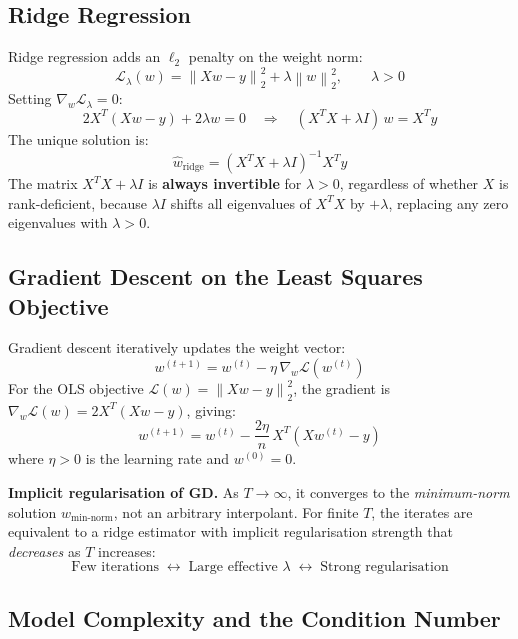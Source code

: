 \documentclass[12pt, a4paper]{article}
\newcommand{\norm}[1]{\left\lVert #1 \right\rVert}
\begin{document}
\subsection{Ridge Regression}

Ridge regression adds an $\ell_2$ penalty on the weight norm:
\begin{equation}
  \mathcal{L}_\lambda(w) = \norm{Xw - y}_2^2 + \lambda\norm{w}_2^2, \qquad \lambda > 0
  \label{eq:ridge_loss}
\end{equation}
Setting $\nabla_w \mathcal{L}_\lambda = 0$:
\[
  2X^T(Xw - y) + 2\lambda w = 0 \quad\Longrightarrow\quad (X^TX + \lambda I)\,w = X^Ty
\]
The unique solution is:
\begin{equation}
  \hat{w}_{\mathrm{ridge}} = (X^TX + \lambda I)^{-1}X^Ty
  \label{eq:ridge}
\end{equation}
The matrix $X^TX + \lambda I$ is \textbf{always invertible} for $\lambda > 0$, regardless of whether $X$ is rank-deficient, because $\lambda I$ shifts all eigenvalues of $X^TX$ by $+\lambda$, replacing any zero eigenvalues with $\lambda > 0$.

\subsection{Gradient Descent on the Least Squares Objective}

Gradient descent iteratively updates the weight vector:
\begin{equation}
  w^{(t+1)} = w^{(t)} - \eta\,\nabla_w\mathcal{L}(w^{(t)})
  \label{eq:gd_update}
\end{equation}
For the OLS objective $\mathcal{L}(w) = \norm{Xw - y}_2^2$, the gradient is $\nabla_w\mathcal{L}(w) = 2X^T(Xw - y)$, giving:
\begin{equation}
  w^{(t+1)} = w^{(t)} - \frac{2\eta}{n}\,X^T(Xw^{(t)} - y)
  \label{eq:gd}
\end{equation}
where $\eta > 0$ is the learning rate and $w^{(0)} = {0}$.

\textbf{Implicit regularisation of GD.} As $T \to \infty$, it converges to the \emph{minimum-norm} solution $\hat{w}_{\mathrm{min\text{-}norm}}$, not an arbitrary interpolant. For finite $T$, the iterates are equivalent to a ridge estimator with implicit regularisation strength that \emph{decreases} as $T$ increases:
\[
  \text{Few iterations} \;\longleftrightarrow\; \text{Large effective }\lambda \;\longleftrightarrow\; \text{Strong regularisation}
\]

\subsection{Model Complexity and the Condition Number}
\end{document}
